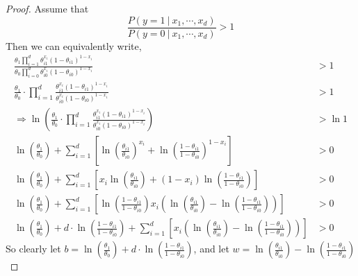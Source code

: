 \documentclass{article}
\theoremstyle{definition}
\begin{document}
        \begin{proof}
            Assume that 
            \[
                \frac{P(y=1 \ | \ x_1, \cdots , x_d)}{P(y=0 \ | \ x_1, \cdots, x_d)} > 1   
            \]
            Then we can equivalently write,
            \begin{align*}
                \frac{
                    \theta_1 \prod_{i=1}^d \theta_{i1}^{x_i}(1 - \theta_{i1})^{1 - x_i}
                }{
                    \theta_0 \prod_{i=0}^d \theta_{i0}^{x_i}(1 - \theta_{i0})^{1- x_i}
                } &> 1 
                \\
                \frac{\theta_1}{\theta_0} \cdot 
                \prod_{i=1}^d \frac{\theta_{i1}^{x_i}(1 - \theta_{i1})^{1-x_i}}{
                    \theta_{i0}^{x_i}(1 - \theta_{i0})^{1-x_i}
                } &> 1 
                \\
                \Longrightarrow \ln\left(\frac{\theta_1}{\theta_0} \cdot 
                \prod_{i=1}^d \frac{\theta_{i1}^{x_i}(1 - \theta_{i1})^{1-x_i}}{
                    \theta_{i0}^{x_i}(1 - \theta_{i0})^{1-x_i}
                }\right) &>\ln 1 
                \\ 
                \ln\left(\frac{\theta_1}{\theta_0}\right) + \sum_{i=1}^d \left[
                    \ln\left(\frac{\theta_{i1}}{\theta_{i0}}\right)^{x_i} + 
                    \ln\left(\frac{1- \theta_{i1}}{1 - \theta_{i0}}\right)^{1-x_i}
                \right] &> 0 
                \\
                \ln\left(\frac{\theta_1}{\theta_0}\right) + \sum_{i=1}^d \left[
                    x_i \ln\left(\frac{\theta_{i1}}{\theta_{i0}}\right) + 
                    (1-x_i) \ln\left(\frac{1- \theta_{i1}}{1 - \theta_{i0}}\right)
                \right] &> 0 
                \\
                \ln\left(\frac{\theta_1}{\theta_0}\right) + \sum_{i=1}^d \left[
                   \ln\left(
                       \frac{1-\theta_{i1}}{1-\theta_{i0}}
                   \right) 
                    x_i \left(
                        \ln\left(\frac{\theta_{i1}}{\theta_{i0}}\right) - 
                        \ln\left(\frac{1- \theta_{i1}}{1 - \theta_{i0}}\right)
                    \right)
                \right] &> 0 
                \\
                \ln\left(\frac{\theta_1}{\theta_0}\right) + 
                d \cdot \ln\left(
                    \frac{1-\theta_{i1}}{1-\theta_{i0}}
                \right) +
                \sum_{i=1}^d \left[
                    x_i \left(
                        \ln\left(\frac{\theta_{i1}}{\theta_{i0}}\right) - 
                        \ln\left(\frac{1- \theta_{i1}}{1 - \theta_{i0}}\right)
                    \right)
                \right] &> 0 
            \end{align*}
            So clearly let $b = \ln \left(\frac{\theta_1}{\theta_0}\right) + d \cdot \ln\left(
                \frac{1-\theta_{i1}}{1-\theta_{i0}}
            \right)$, and let $w = 
                \ln\left(\frac{\theta_{i1}}{\theta_{i0}}\right) - 
                \ln\left(\frac{1- \theta_{i1}}{1 - \theta_{i0}}\right)$
        \end{proof}
\end{document}
